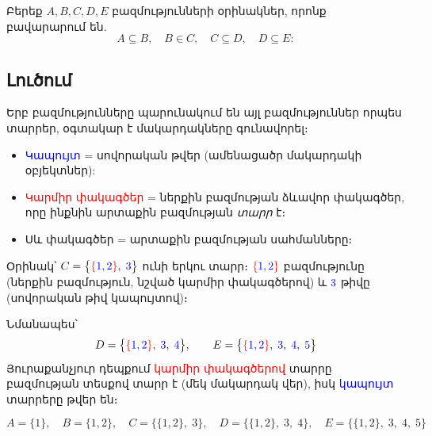 \documentclass[12pt, a4paper]{article}
\begin{document}
\begin{problembox}
Բերեք $A, B, C, D, E$ բազմությունների օրինակներ, որոնք բավարարում են.
\[
  A \subseteq B, \quad B \in C, \quad C \subseteq D, \quad D \subseteq E:
\]
\end{problembox}

\subsection*{Լուծում}

\begin{tcolorbox}[colback=gray!3, colframe=gray!60, arc=2mm, left=5pt, right=5pt, top=5pt, bottom=5pt, title={\small Գունային ուղեցույց. Ներդրված մակարդակների տեսանելիություն}]
Երբ բազմությունները պարունակում են այլ բազմություններ որպես տարրեր, օգտակար է մակարդակները գունավորել։
\begin{itemize}[nosep]
  \item \textcolor{blue}{Կապույտ} = սովորական թվեր (ամենացածր մակարդակի օբյեկտներ):
  \item \textcolor{red}{Կարմիր փակագծեր} = ներքին բազմության ձևավոր փակագծեր, որը ինքնին արտաքին բազմության \emph{տարր} է։
  \item Սև փակագծեր = արտաքին բազմության սահմանները։
\end{itemize}

\medskip
Օրինակ՝ $C = \bigl\{\textcolor{red}{\{}\textcolor{blue}{1,2}\textcolor{red}{\}},\;\textcolor{blue}{3}\bigr\}$ ունի երկու տարր։
$\textcolor{red}{\{}\textcolor{blue}{1,2}\textcolor{red}{\}}$ բազմությունը (ներքին բազմություն, նշված կարմիր փակագծերով) և $\textcolor{blue}{3}$ թիվը (սովորական թիվ կապույտով)։

\medskip
Նմանապես՝
\[
  D = \bigl\{\textcolor{red}{\{}\textcolor{blue}{1,2}\textcolor{red}{\}},\;\textcolor{blue}{3},\;\textcolor{blue}{4}\bigr\},
  \qquad
  E = \bigl\{\textcolor{red}{\{}\textcolor{blue}{1,2}\textcolor{red}{\}},\;\textcolor{blue}{3},\;\textcolor{blue}{4},\;\textcolor{blue}{5}\bigr\}
\]
Յուրաքանչյուր դեպքում \textcolor{red}{կարմիր փակագծերով} տարրը բազմության տեսքով տարր է (մեկ մակարդակ վեր), իսկ \textcolor{blue}{կապույտ} տարրերը թվեր են։
\end{tcolorbox}

\[
  A = \{1\}, \quad B = \{1,2\}, \quad C = \bigl\{\{1,2\},\;3\bigr\}, \quad
  D = \bigl\{\{1,2\},\;3,\;4\bigr\}, \quad E = \bigl\{\{1,2\},\;3,\;4,\;5\bigr\}
\]
\end{document}
